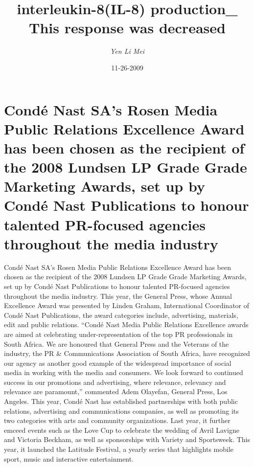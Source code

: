 \documentclass{article}%
\title{interleukin{-}8(IL{-}8) production\_ This response was decreased}%
\author{\textit{Yen Li Mei}}%
\date{11-26-2009}%
\begin{document}
%
\normalsize%
\maketitle%
\section{Condé Nast SA's Rosen Media Public Relations Excellence Award has been chosen as the recipient of the 2008 Lundsen LP Grade Grade Marketing Awards, set up by Condé Nast Publications to honour talented PR{-}focused agencies throughout the media industry}%
\label{sec:CondNastSAsRosenMediaPublicRelationsExcellenceAwardhasbeenchosenastherecipientofthe2008LundsenLPGradeGradeMarketingAwards,setupbyCondNastPublicationstohonourtalentedPR{-}focusedagenciesthroughoutthemediaindustry}%
Condé Nast SA's Rosen Media Public Relations Excellence Award has been chosen as the recipient of the 2008 Lundsen LP Grade Grade Marketing Awards, set up by Condé Nast Publications to honour talented PR{-}focused agencies throughout the media industry.\newline%
This year, the General Press, whose Annual Excellence Award was presented by Linden Graham, International Coordinator of Condé Nast Publications, the award categories include, advertising, materials, edit and public relations.\newline%
“Condé Nast Media Public Relations Excellence awards are aimed at celebrating under{-}representation of the top PR professionals in South Africa. We are honoured that General Press and the Veterans of the industry, the PR \& Communications Association of South Africa, have recognized our agency as another good example of the widespread importance of social media in working with the media and consumers. We look forward to continued success in our promotions and advertising, where relevance, relevancy and relevance are paramount,” commented Adem Olayefan, General Press, Los Angeles.\newline%
This year, Condé Nast has established partnerships with both public relations, advertising and communications companies, as well as promoting its two categories with arts and community organizations. Last year, it further emceed events such as the Love Cup to celebrate the wedding of Avril Lavigne and Victoria Beckham, as well as sponsorships with Variety and Sportsweek. This year, it launched the Latitude Festival, a yearly series that highlights mobile sport, music and interactive entertainment.\newline%
\end{document}
